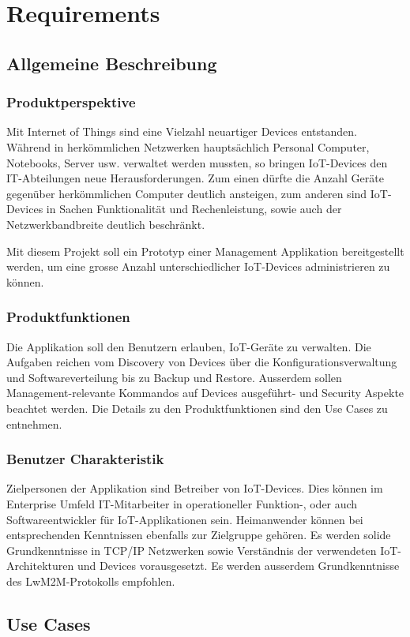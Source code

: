 \chapter{Requirements}
\section{Allgemeine Beschreibung}
\subsection{Produktperspektive}
Mit Internet of Things sind eine Vielzahl neuartiger Devices entstanden. Während in herkömmlichen Netzwerken hauptsächlich Personal Computer, Notebooks, Server usw. verwaltet werden mussten, so bringen IoT-Devices den IT-Abteilungen neue Herausforderungen. Zum einen dürfte die Anzahl Geräte gegenüber herkömmlichen Computer deutlich ansteigen, zum anderen sind IoT-Devices in Sachen Funktionalität und Rechenleistung, sowie auch der Netzwerkbandbreite deutlich beschränkt. 

Mit diesem Projekt soll ein Prototyp einer Management Applikation bereitgestellt werden, um eine grosse Anzahl unterschiedlicher IoT-Devices administrieren zu können. 
\subsection{Produktfunktionen}
Die Applikation soll den Benutzern erlauben, IoT-Geräte zu verwalten. Die Aufgaben reichen vom Discovery von Devices über die Konfigurationsverwaltung und Softwareverteilung bis zu Backup und Restore. Ausserdem sollen Management-relevante Kommandos auf Devices ausgeführt- und Security Aspekte beachtet werden. Die Details zu den Produktfunktionen sind den Use Cases zu entnehmen.

\subsection{Benutzer Charakteristik}
\label{sec:benutzercharakteristik}
Zielpersonen der Applikation sind Betreiber von IoT-Devices. Dies können im Enterprise Umfeld IT-Mitarbeiter in operationeller Funktion-, oder auch Softwareentwickler für IoT-Applikationen sein. Heimanwender können bei entsprechenden Kenntnissen ebenfalls zur Zielgruppe gehören. Es werden solide Grundkenntnisse in TCP/IP Netzwerken sowie Verständnis der verwendeten IoT-Architekturen und Devices vorausgesetzt. Es werden ausserdem Grundkenntnisse des LwM2M-Protokolls empfohlen. 
\section{Use Cases}
\label{sec:usecases}
